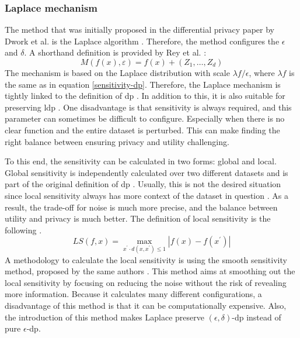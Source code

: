 \subsubsection{Laplace mechanism} \label{laplace}
The method that was initially proposed in the differential privacy paper by Dwork et al. is the Laplace algorithm \citep{dwork_differential_2006}.
Therefore, the method configures the $\epsilon$ and $\delta$. A shorthand definition is provided by Rey et al. \citep{del_rey_comprehensive_2020}:
\begin{equation}
  M\left(f\left(x\right),\varepsilon\right)=f\left(x\right)+\left(Z_{1},\ldots,Z_{d}\right)
\end{equation}
The mechanism is based on the Laplace distribution with scale $\lambda f/\epsilon$, where $\lambda f$ is the same as in equation \ref{sensitivity-dp}.
Therefore, the Laplace mechanism is tightly linked to the definition of \gls{dp} \citep{dwork_differential_2006}.
In addition to this, it is also suitable for preserving \gls{ldp} \citep{del_rey_comprehensive_2020}.
One disadvantage is that sensitivity is always required, and this parameter can sometimes be difficult to configure.
Especially when there is no clear function and the entire dataset is perturbed.
This can make finding the right balance between ensuring privacy and utility challenging.

To this end, the sensitivity can be calculated in two forms: global and local.
Global sensitivity is independently calculated over two different datasets and is part of the original definition of \gls{dp} \citep{dwork_differential_2006}.
Usually, this is not the desired situation since local sensitivity always has more context of the dataset in question \citep{nissim_smooth_2007}.
As a result, the trade-off for noise is much more precise, and the balance between utility and privacy is much better.
The definition of local sensitivity is the following \citep{nissim_smooth_2007}.
\begin{equation}
  LS(f,x)=\operatorname*{max}_{x^{\prime}\cdot d(x,x^{\prime})\leq1}|f(x)-f(x^{\prime})|
  \label{local-sensitivity}
\end{equation}
A methodology to calculate the local sensitivity is using the smooth sensitivity method, proposed by the same authors \citep{nissim_smooth_2007}.
This method aims at smoothing out the local sensitivity by focusing on reducing the noise without the risk of revealing more information.
Because it calculates many different configurations, a disadvantage of this method is that it can be computationally expensive.
Also, the introduction of this method makes Laplace preserve $(\epsilon, \delta)$-\gls{dp} instead of pure $\epsilon$-\gls{dp}.

